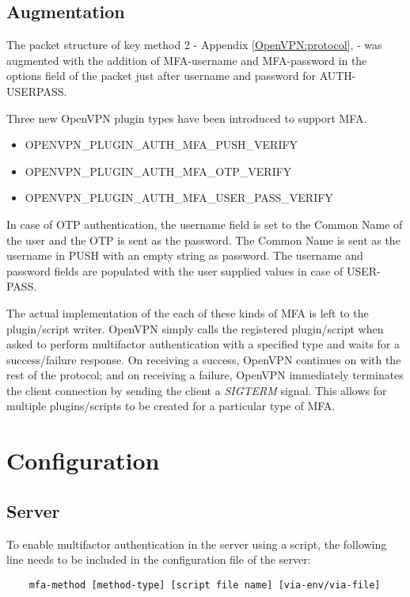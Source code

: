 \documentclass[11pt,oneside]{book}
\begin{document}
\subsection{Augmentation}
The packet structure of key method 2 - Appendix \ref{OpenVPN:protocol}, \pageref{OpenVPN:protocol} -
was augmented with the addition of MFA-username and MFA-password in the options field of the packet
just after username and password for AUTH-USERPASS.

Three new OpenVPN plugin types have been introduced to support MFA.

\begin{itemize}
     \item OPENVPN\_PLUGIN\_AUTH\_MFA\_PUSH\_VERIFY
     \item OPENVPN\_PLUGIN\_AUTH\_MFA\_OTP\_VERIFY
     \item OPENVPN\_PLUGIN\_AUTH\_MFA\_USER\_PASS\_VERIFY
\end{itemize}

In case of OTP authentication, the username field is set to the Common Name of the user and the OTP
is sent as the password. The Common Name is sent as the username in PUSH with an empty string as
password. The username and password fields are populated with the user supplied values in case of
USER-PASS.

The actual implementation of the each of these kinds of MFA is left to the plugin/script writer.
OpenVPN simply calls the registered plugin/script when asked to perform multifactor authentication
with a specified type and waits for a success/failure response. On receiving a success, OpenVPN
continues on with the rest of the protocol; and on receiving a failure, OpenVPN immediately
terminates the client connection by sending the client a \emph{SIGTERM} signal. This allows for
multiple plugins/scripts to be created for a particular type of MFA.

\section{Configuration}
\subsection{Server}
To enable multifactor authentication in the server using a script, the following line needs to be
included in the configuration file of the server:

\begin{verbatim}
    mfa-method [method-type] [script file name] [via-env/via-file]
\end{verbatim}
\end{document}
